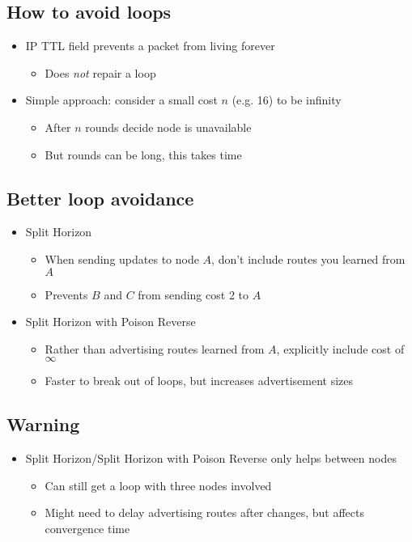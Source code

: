 \subsection{How to avoid loops}
\begin{itemize}[nosep]
    \item IP TTL field prevents a packet from living forever
          \begin{itemize}[nosep]
              \item Does \emph{not} repair a loop
          \end{itemize}
    \item Simple approach: consider a small cost $n$ (e.g. 16) to be infinity
          \begin{itemize}[nosep]
              \item After $n$ rounds decide node is unavailable
              \item But rounds can be long, this takes time
          \end{itemize}
\end{itemize}
\subsection{Better loop avoidance}
\begin{itemize}[nosep]
    \item Split Horizon
          \begin{itemize}[nosep]
              \item When sending updates to node $A$, don't include routes you learned from $A$
              \item Prevents $B$ and $C$ from sending cost 2 to $A$
          \end{itemize}
    \item Split Horizon with Poison Reverse
          \begin{itemize}[nosep]
              \item Rather than advertising routes learned from $A$, explicitly include cost of $\infty$
              \item Faster to break out of loops, but increases advertisement sizes
          \end{itemize}
\end{itemize}
\subsection{Warning}
\begin{itemize}[nosep]
    \item Split Horizon/Split Horizon with Poison Reverse only helps between nodes
          \begin{itemize}[nosep]
              \item Can still get a loop with three nodes involved
              \item Might need to delay advertising routes after changes, but affects convergence time
          \end{itemize}
\end{itemize}

